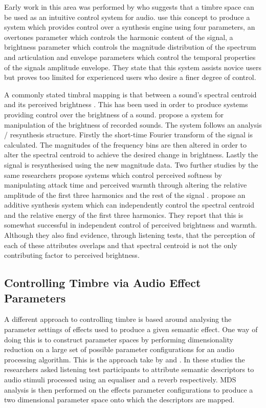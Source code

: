 		Early work in this area was performed by \citet{wessel1979timbre} who suggests that a timbre space can be
		used as an intuitive control system for audio. \citet{vertegaal1994isee} use this concept to produce a
		system which provides control over a synthesis engine using four parameters, an overtones parameter which
		controls the harmonic content of the signal, a brightness parameter which controls the magnitude
		distribution of the spectrum and articulation and envelope parameters which control the temporal properties
		of the signals amplitude envelope. They state that this system assists novice users but proves too limited
		for experienced users who desire a finer degree of control.

		A commonly stated timbral mapping is that between a sound's spectral centroid and its perceived brightness
		\citep{schubert2006does}. This has been used in order to produce systems providing control over the
		brightness of a sound. \citet{williams2007perceptually} propose a system for manipulation of the brightness
		of recorded sounds. The system follows an analysis / resynthesis structure. Firstly the short-time Fourier
		transform of the signal is calculated. The magnitudes of the frequency bins are then altered in order to
		alter the spectral centroid to achieve the desired change in brightness. Lastly the signal is resynthesised
		using the new magnitude data.  Two further studies by the same researchers propose systems which control
		perceived softness by manipulating attack time \citep{williams2009perceptually} and perceived warmth
		through altering the relative amplitude of the first three harmonics and the rest of the signal
		\citep{williams2010perceptually}. \citet{zacharakis2011an} propose an additive synthesis system which can
		independently control the spectral centroid and the relative energy of the first three harmonics. They
		report that this is somewhat successful in independent control of perceived brightness and warmth. Although
		they also find evidence, through listening tests, that the perception of each of these attributes overlaps
		and that spectral centroid is not the only contributing factor to perceived brightness.

	\subsection{Controlling Timbre via Audio Effect Parameters}
	\label{sec:Timbre-Control-ParameterSpaces}
		A different approach to controlling timbre is based around analysing the parameter settings of effects used
		to produce a given semantic effect. One way of doing this is to construct parameter spaces by performing
		dimensionality reduction on a large set of possible parameter configurations for an audio processing
		algorithm. This is the approach take by \citet{cartwright2013socialeq} and
		\citet{seetharaman2014crowdsourcing}. In these studies the researchers asked listening test participants to
		attribute semantic descriptors to audio stimuli processed using an equaliser and a reverb respectively. MDS
		analysis is then performed on the effects parameter configurations to produce a two dimensional parameter
		space onto which the descriptors are mapped.

